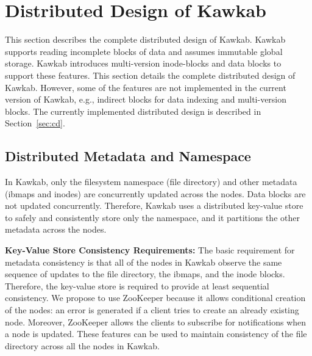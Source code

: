 \documentclass[]{article}
\newcommand{\subtopic}[1]{\vspace{1.5pt} \noindent \textbf{#1}}
\begin{document}
%



\section{Distributed Design of Kawkab}

This section describes the complete distributed design of Kawkab. Kawkab
supports reading incomplete blocks of data and assumes immutable global
storage. Kawkab introduces multi-version inode-blocks and data blocks to
support these features. This section details the complete distributed design of
Kawkab. However, some of the features are not implemented in the current
version of Kawkab, e.g., indirect blocks for data indexing and multi-version
blocks. The currently implemented distributed design  is described in
Section~\ref{sec:cd}.


\subsection{Distributed Metadata and Namespace}

In Kawkab, only the filesystem namespace (file directory) and other metadata
(ibmaps and inodes) are concurrently updated across the nodes. Data blocks are
not updated concurrently. Therefore, Kawkab uses a distributed key-value store
to safely and consistently store only the namespace, and it partitions the 
other metadata across the nodes.

\subtopic{Key-Value Store Consistency Requirements:} The basic requirement for
metadata consistency is that all of the nodes in Kawkab observe the same
sequence of updates to the file directory, the ibmaps, and the inode blocks.  
Therefore, the key-value store is required to provide at least sequential
consistency.
We propose to use ZooKeeper because it allows conditional creation of the
nodes: an error is generated if a client tries to create an already existing
node. Moreover, ZooKeeper allows the clients to subscribe for notifications
when a node is updated.  These features can be used to maintain consistency
of the file directory across all the nodes in Kawkab.
\end{document}
